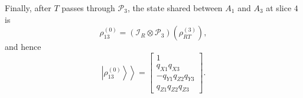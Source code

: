 Finally, after \(T\) passes through \(\mathcal P_3\), the state shared
between \(A_1\) and \(A_3\) at slice \(4\) is
\begin{equation}
\rho_{13}^{(0)}
=
\left(\mathcal I_R\otimes\mathcal P_3\right)
\left(\rho_{RT}^{(3)}\right),
\end{equation}
and hence
\begin{equation}
\left.\left|\rho_{13}^{(0)}\right\rangle\right\rangle
=
\begin{bmatrix}
1\\
q_{X1}q_{X3}\\
-q_{Y1}q_{Z2}q_{Y3}\\
q_{Z1}q_{Z2}q_{Z3}
\end{bmatrix}.
\label{eq:mergecast-slice-state}
\end{equation}